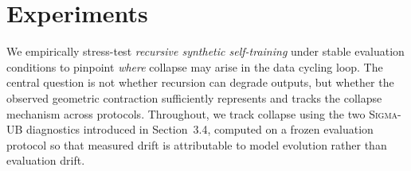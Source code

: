 \documentclass{article}
\theoremstyle{plain}
\theoremstyle{definition}
\theoremstyle{remark}
\newcommand{\sgma}{\textsc{Sigma}\xspace}
\begin{document}


\section{Experiments}
\label{sec:experiments}

We empirically stress-test \emph{recursive synthetic self-training} under stable evaluation conditions to pinpoint \emph{where} collapse may arise in the data cycling loop. The central question is not whether recursion can degrade outputs, but whether the observed geometric contraction sufficiently represents and tracks the collapse mechanism across protocols. Throughout, we track collapse using the two \sgma-UB diagnostics introduced in Section~3.4, computed on a frozen evaluation protocol so that measured drift is attributable to model evolution rather than evaluation drift.

\smallskip
\end{document}
